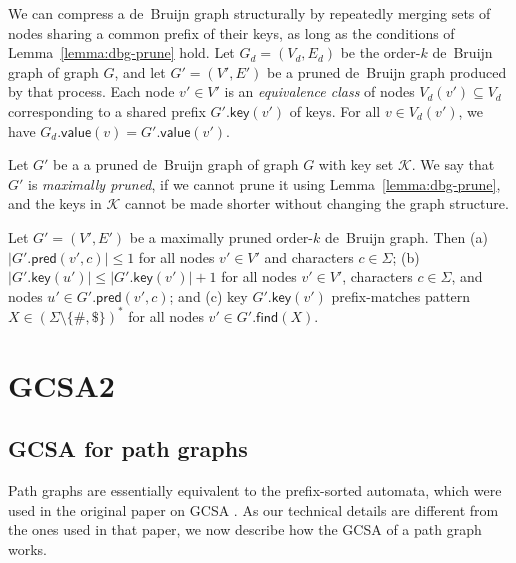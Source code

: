 \documentclass[a4paper,UKenglish]{lipics-v2016}
\newcommand{\set}[1]{\ensuremath{\{ #1 \}}}
\newcommand{\abs}[1]{\ensuremath{\lvert #1 \rvert}}
\newcommand{\find}{\ensuremath{\mathsf{find}}}
\newcommand{\gpred}{\ensuremath{\mathsf{pred}}}
\newcommand{\gkey}{\ensuremath{\mathsf{key}}}
\newcommand{\gvalue}{\ensuremath{\mathsf{value}}}
\newcommand{\orderk}[1]{order\nobreakdash-$#1$}
\newcommand{\patternset}{\ensuremath{(\Sigma \setminus \set{\#, \$})^{\ast}}}
\begin{document}
We can compress a de~Bruijn graph structurally by repeatedly merging sets of nodes sharing a common prefix of their keys, as long as the conditions of Lemma~\ref{lemma:dbg-prune} hold. Let $G_{d} = (V_{d}, E_{d})$ be the \orderk{k} de~Bruijn graph of graph $G$, and let $G' = (V', E')$ be a pruned de~Bruijn graph produced by that process. Each node $v' \in V'$ is an \emph{equivalence class} of nodes $V_{d}(v') \subseteq V_{d}$ corresponding to a shared prefix $G'.\gkey(v')$ of keys. For all $v \in V_{d}(v')$, we have $G_{d}.\gvalue(v) = G'.\gvalue(v')$.

\begin{definition}
Let $G'$ be a a pruned de~Bruijn graph of graph $G$ with key set $\mathcal{K}$. We say that $G'$ is \emph{maximally pruned}, if we cannot prune it using Lemma~\ref{lemma:dbg-prune}, and the keys in $\mathcal{K}$ cannot be made shorter without changing the graph structure.
\end{definition}

\begin{lemma}\label{lemma:dbg-maximal}
Let $G' = (V', E')$ be a maximally pruned \orderk{k} de~Bruijn graph. Then
(a) $\abs{G'.\gpred(v', c)} \le 1$ for all nodes $v' \in V'$ and characters $c \in \Sigma$;
(b) $\abs{G'.\gkey(u')} \le \abs{G'.\gkey(v')}+1$ for all nodes $v' \in V'$, characters $c \in \Sigma$, and nodes $u' \in G'.\gpred(v', c)$; and
(c) key $G'.\gkey(v')$ prefix-matches pattern $X \in \patternset$ for all nodes $v' \in G'.\find(X)$.
\end{lemma}


\section{GCSA2}

\subsection{GCSA for path graphs}

Path graphs are essentially equivalent to the prefix-sorted automata, which were used in the original paper on GCSA \cite{Siren2014}. As our technical details are different from the ones used in that paper, we now describe how the GCSA of a path graph works.
\end{document}
